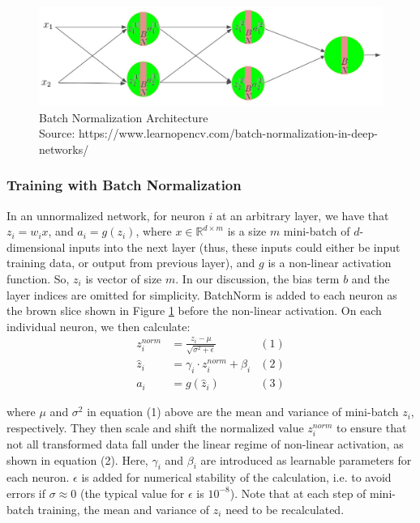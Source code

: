 \documentclass{article}
\begin{document}
\begin{figure}[h]
	\centering
    \includegraphics[width=\textwidth]{pics/batchNorm/batch-normalization.jpg}
	\caption{Batch Normalization Architecture\\Source: https://www.learnopencv.com/batch-normalization-in-deep-networks/}
	\label{fig:batchnorm}
\end{figure}

\subsubsection{Training with Batch Normalization}
In an unnormalized network, for neuron $i$ at an arbitrary layer, we have that $z_i=w_ix$, and $a_i=g(z_i)$, where $x\in\mathbb{R}^{d\times m}$ is a size $m$ mini-batch of $d$-dimensional inputs into the next layer (thus, these inputs could either be input training data, or output from previous layer), and $g$ is a non-linear activation function. So, $z_i$ is vector of size $m$. In our discussion, the bias term $b$ and the layer indices are omitted for simplicity. BatchNorm is added to each neuron as the brown slice shown in Figure \ref{fig:batchnorm} before the non-linear activation. On each individual neuron, we then calculate:
\begin{align*}
    z_i^{norm}& = \frac{z_i-\mu}{\sqrt{\sigma^2+\epsilon}}  &(1)\\
    \hat{z}_i&= \gamma_i\cdot z_i^{norm}+\beta_i  &(2)\\
    a_i&=g(\hat{z}_i) &(3)
\end{align*}

where $\mu$ and $\sigma^2$ in equation (1) above are the mean and variance of mini-batch $z_i$, respectively. They then scale and shift the normalized value $z_i^{norm}$ to ensure that not all transformed data fall under the linear regime of non-linear activation, as shown in equation (2). Here, $\gamma_i$ and $\beta_i$ are introduced as learnable parameters for each neuron.  $\epsilon$ is added for numerical stability of the calculation, i.e. to avoid errors if $\sigma \approx 0$ (the typical value for $\epsilon$ is $10^{-8}$). Note that at each step of mini-batch training, the mean and variance of $z_i$ need to be recalculated.
\end{document}
